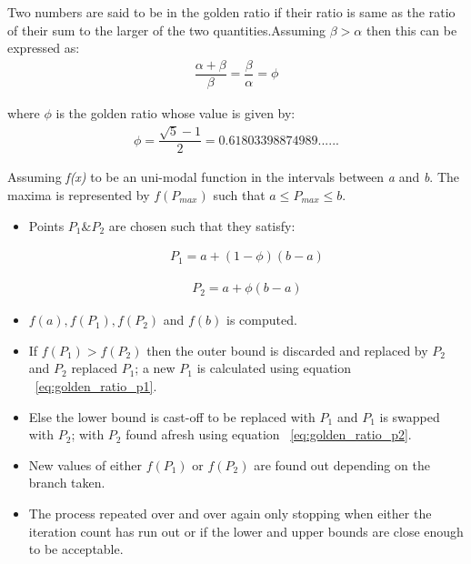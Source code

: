 {Two numbers are said to be in the golden ratio if their ratio is same as the ratio of their sum to the larger of the two quantities.Assuming $\beta > \alpha$ then this can be expressed as\cite{Gill81MurrayWright}:\\

\begin{equation}
	\begin{aligned}
		\dfrac{\alpha+\beta}{\beta}=\dfrac{\beta}{\alpha}=\phi
		\label{eq:golden_ratio1}
	\end{aligned}
\end{equation}

where ${\phi}$ is the golden ratio whose value is given by:\\

\begin{equation}
	\begin{aligned}
		 \phi=\dfrac{\sqrt{5}-1}{2}= 0.61803398874989......
		\label{eq:golden_ratio}
	\end{aligned}
\end{equation}
 
 Assuming \textit{f(x)} to be an uni-modal function in the intervals between  \textit{a} and \textit{b}. The maxima is represented by $\textit{f}(P_{\textit{max}})$ such that $a\leq P_{\textit{max}} \leq b $.
 \begin{itemize}
 
 \item Points $P_{1} \& P_{2}$ are chosen such that they satisfy:
 
\begin{equation}
	\begin{aligned}
		 P_{1}=a+(1-\phi)(b-a)
		\label{eq:golden_ratio_p1}
	\end{aligned}
\end{equation}

\begin{equation}
	\begin{aligned}
		 P_{2}=a+\phi(b-a)
		\label{eq:golden_ratio_p2}
	\end{aligned}
\end{equation}


	\item $\textit{f}(a),\textit{f}(P_{1}),\textit{f}(P_{2})$ and $\textit{f}(b)$ is computed.
	\item If $\textit{f}(P_{1}) > \textit{f}(P_{2})$ then the outer bound is discarded and replaced by $ P_{2} $ and $ P_{2}$ replaced $ P_{1}$; a new $ P_{1}$ is calculated using equation ~\ref{eq:golden_ratio_p1}.
	\item Else the lower bound is cast-off to be replaced with $ P_{1}$ and $ P_{1}$ is swapped with $ P_{2}$; with $ P_{2}$ found afresh using equation ~\ref{eq:golden_ratio_p2}.
	\item New values of either $\textit{f}(P_{1})$ or $\textit{f}(P_{2})$ are found out depending on the branch taken.
	\item  The process repeated over and over again only stopping when either the iteration count has run out or if the lower and upper bounds are close enough to be acceptable. 
\end{itemize}

}
